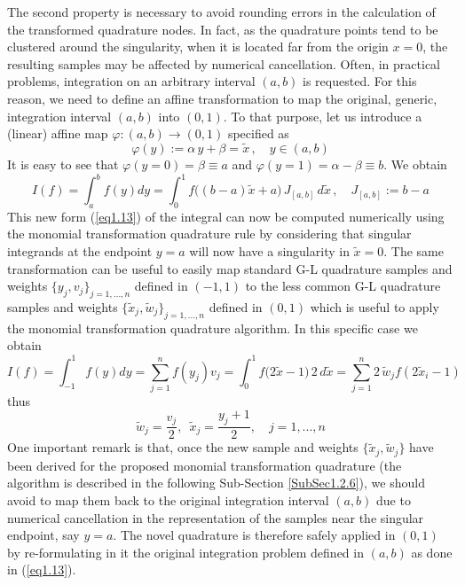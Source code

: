 \documentclass[a4paper, twosided]{book}
\begin{document}
\noindent
The second property is necessary to avoid rounding errors in the calculation of the transformed quadrature nodes. In fact, as the quadrature points tend to be clustered around the singularity, when it is located far from the origin $x=0$, the resulting samples may be affected by numerical cancellation. Often, in practical problems, integration on an arbitrary interval $(a,b)$ is requested. For this reason, we need to define an affine transformation to map the original, generic, integration interval $(a,b)$ into $(0,1)$. To that purpose, let us introduce a (linear) affine map $\varphi:(a,b)\to(0,1)$ specified as
\begin{equation}\label{eq1.12}
    \varphi(y) := \alpha\,y + \beta = \tilde{x}\,,\quad y\in(a,b)
\end{equation}
\noindent
It is easy to see that $\varphi(y=0)=\beta\equiv a$ and $\varphi(y=1)=\alpha-\beta\equiv b$. We obtain
\begin{equation}\label{eq1.13}
    I(f) = \int_a^b f(y) dy = \int_{0}^{1} f\Big(({b-a})\tilde{x}+a\Big)\,J_{[a,b]}\,d\tilde{x}\,,\quad J_{[a,b]}:=b-a
\end{equation}
\noindent
This new form (\ref{eq1.13}) of the integral can now be computed numerically using the monomial transformation quadrature rule by considering that singular integrands at the endpoint $y=a$ will now have a singularity in $\tilde{x}=0$. The same transformation can be useful to easily map standard G-L quadrature samples and weights $\{y_j, v_j\}_{j=1,...,n}$ defined in $(-1,1)$ to the less common G-L quadrature samples and weights $\{\tilde{x}_j,\tilde{w}_j\}_{j=1,...,n}$ defined in $(0,1)$ which is useful to apply the monomial transformation quadrature algorithm. In this specific case we obtain
\begin{equation}\label{eq1.14}
    I(f) = \int_{-1}^1 f(y) dy =\sum_{j=1}^n f(y_j)v_j = \int_{0}^{1} f\Big(2\tilde{x}-1\Big)\,2\, d\tilde{x}=\sum_{j=1}^n 2\,\tilde{w}_j f(2 \tilde{x}_i-1)
\end{equation}
\noindent
thus
\begin{equation}\label{eq1.15}
    \tilde{w}_j=\frac{v_j}{2}, \;\: \tilde{x}_j=\frac{y_j+1}{2}, \quad j=1,...,n
\end{equation}
\noindent
One important remark is that, once the new sample and weights $\{\tilde{x}_j,\tilde{w}_j\}$ have been derived for the proposed monomial transformation quadrature (the algorithm is described in the following Sub-Section \ref{SubSec1.2.6}), we should avoid to map them back to the original integration interval $(a,b)$ due to numerical cancellation in the representation of the samples near the singular endpoint, say $y=a$. The novel quadrature is therefore safely applied in $(0,1)$ by re-formulating in it the original integration problem defined in $(a,b)$ as done in (\ref{eq1.13}).
\end{document}
